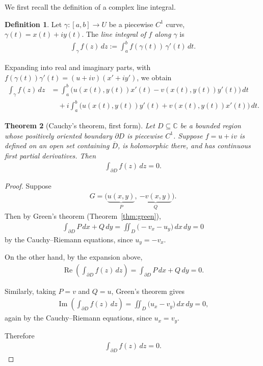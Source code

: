 \documentclass[11pt]{article}
\theoremstyle{plain}
\newtheorem{theorem}{Theorem}[section]
\theoremstyle{definition}
\newtheorem{definition}[theorem]{Definition}
\theoremstyle{remark}
\numberwithin{equation}{section}
\newcommand{\be}{\begin{eqnarray}}
\newcommand{\ee}{\end{eqnarray}}
\newcommand{\C}{\mathbb{C}}
\DeclareMathOperator{\Real}{Re}
\DeclareMathOperator{\Imag}{Im}
\begin{document}
We first recall the definition of a complex line integral.

\begin{definition}
Let $\gamma:[a,b]\to U$ be a piecewise $C^1$ curve,
$\gamma(t)=x(t)+iy(t)$.
The \emph{line integral of $f$ along $\gamma$} is
\be
 \int_\gamma f(z)\,dz:=\int_a^b f(\gamma(t))\,\gamma'(t)\,dt.
\ee
\end{definition}

Expanding into real and imaginary parts, with
$f(\gamma(t))\gamma'(t)=(u+iv)(x'+iy')$, we obtain
\begin{align*}
 \int_\gamma f(z)\,dz
 &=\int_a^b\bigl(u(x(t),y(t))x'(t)-v(x(t),y(t))y'(t)\bigr)\,dt\\
 &\quad+i\int_a^b\bigl(u(x(t),y(t))y'(t)+v(x(t),y(t))x'(t)\bigr)\,dt.
\end{align*}

\begin{theorem}[Cauchy's theorem, first form]
\label{thm:cauchy-green}
Let $D\subseteq\C$ be a bounded region whose positively oriented boundary
$\partial D$ is piecewise $C^1$. Suppose $f=u+iv$ is defined on an open set
containing $\overline D$, is holomorphic there, and has continuous first
partial derivatives. Then
\be
 \boxed{\int_{\partial D}f(z)\,dz=0.}
\ee
\end{theorem}

\begin{proof}
Suppose
\be
 G=\bigl(\underbrace{u(x,y)}_{P},\ \underbrace{-v(x,y)}_{Q}\bigr).
\ee
Then by Green's theorem (Theorem~\ref{thm:green}),
\be
 \int_{\partial D}P\,dx+Q\,dy
 =\iint_D\bigl(-v_x-u_y\bigr)\,dx\,dy=0
\ee
by the Cauchy--Riemann equations, since $u_y=-v_x$.

On the other hand, by the expansion above,
\be
 \Real\left(\int_{\partial D}f(z)\,dz\right)
 =\int_{\partial D}P\,dx+Q\,dy=0.
\ee

Similarly, taking $P=v$ and $Q=u$, Green's theorem gives
\be
 \Imag\left(\int_{\partial D}f(z)\,dz\right)
 =\iint_D\bigl(u_x-v_y\bigr)\,dx\,dy=0,
\ee
again by the Cauchy--Riemann equations, since $u_x=v_y$.

Therefore
\be
 \int_{\partial D}f(z)\,dz=0.
\ee
\end{proof}

\begin{center}
\end{center}
\end{document}
